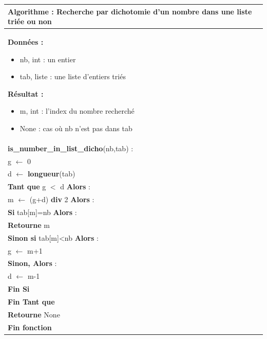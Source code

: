 \documentclass[10pt]{article}
\begin{document}
\begin{pseudo}
\begin{center}
\begin{tabular}{p{}}
\hline
\textbf{Algorithme :} Recherche par dichotomie d'un nombre dans une liste triée ou non \\
\hline
\textbf{Données :}
\begin{itemize}
\item \textsf{nb}, int : un entier 
\item \textsf{tab}, liste : une liste d'entiers triés
\end{itemize}
\textbf{Résultat :} 
\begin{itemize}
\item \textsf{m}, int : l'index du nombre recherché
\item \textsf{None} : cas où \textsf{nb} n'est pas dans \textsf{tab}
\end{itemize}
\\
\textbf{is\_number\_in\_list\_dicho}(\textsf{nb},\textsf{tab}) :\\
\hspace{.4cm}\textsf{g} $\leftarrow$ \textsf{0} \\
\hspace{.4cm}\textsf{d} $\leftarrow$ \textbf{longueur}(\textsf{tab}) \\
\hspace{.4cm}\textbf{Tant que} \textsf{g $<$ d} \textbf{Alors} : \\
\hspace{.8cm} \textsf{m} $\leftarrow$ \textsf{(g+d)} \textbf{div} \textsf{2} \textbf{Alors} :\\
\hspace{1.2cm}\textbf{Si} \textsf{tab[m]=nb} \textbf{Alors} :\\
\hspace{1.6cm}\textbf{Retourne} \textsf{m}\\
\hspace{1.2cm}\textbf{Sinon si} \textsf{tab[m]<nb} \textbf{Alors} :\\
\hspace{1.6cm}\textsf{g} $\leftarrow$ \textsf{m+1}\\
\hspace{1.2cm}\textbf{Sinon, Alors} :\\
\hspace{1.6cm}\textsf{d} $\leftarrow$ \textsf{m-1}\\
\hspace{.8cm} \textbf{Fin Si} \\
\hspace{.4cm}\textbf{Fin Tant que} \\
\hspace{.4cm}\textbf{Retourne} \textsf{None} \\
\textbf{Fin fonction} \\
\hline
\end{tabular}
\end{center}
\end{pseudo}
\end{document}
